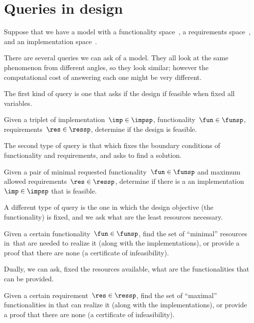 
\section{Queries in design}


Suppose that we have a model with a functionality space~\funsp, a requirements space~\ressp, and an implementation space~\impsp.

There are several queries we can ask of a model.
They all look at the same phenomenon from different angles, so they look similar; however the computational cost of answering each one might be very different.

The first kind of query is one that asks if the design if feasible when fixed all variables.

\begin{problem}
Given a triplet of implementation~$\imp\in\impsp$, functionality~$\fun\in\funsp$, requirements~$\res\in\ressp$, determine if the design is feasible.
\end{problem}

The second type of query is that which fixes the boundary conditions of functionality and requirements, and asks to find a solution.

\begin{problem}
Given a pair of minimal requested functionality~$\fun\in\funsp$ and maximum allowed requirements~$\res\in\ressp$, determine if there is a an implementation~$\imp\in\impsp$ that is feasible.
\end{problem}

A different type of query is the one in which the design objective (the functionality) is fixed, and we ask what are the least resources necessary.

\begin{problem}[FixFunMinRes]
\label{prob:FixFunMinRes-informal}
Given a certain functionality~$\fun\in\funsp$, find the set of ``minimal'' resources in~\ressp that are needed to realize it (along with the implementations), or provide a proof that there are none (a certificate of infeasibility).
\end{problem}

Dually, we can ask, fixed the resources available, what are the functionalities that can be provided.

\begin{problem}[FixReqMinFun]
\label{prob:FixReqMinFun-informal}
Given a certain requirement~$\res\in\ressp$, find the set of ``maximal'' functionalities in that can realize it (along with the implementations), or provide a proof that there are none (a certificate of infeasibility).
\end{problem}

